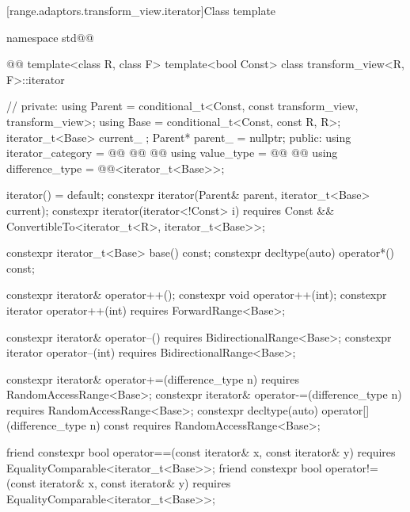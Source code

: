 [range.adaptors.transform_view.iterator]{Class template }

\pnum
{}

\begin{codeblock}
namespace std@@ { @@
  template<class R, class F>
  template<bool Const>
  class transform_view<R, F>::iterator { // \expos
  private:
    using Parent = conditional_t<Const, const transform_view, transform_view>;
    using Base   = conditional_t<Const, const R, R>;
    iterator_t<Base> current_ {};
    Parent* parent_ = nullptr;
  public:
    using iterator_category = @\newtxt{\seebelownc;}@
      @@
    @@
    using value_type        =
      @@
      @@
    using difference_type   = @@<iterator_t<Base>>;

    iterator() = default;
    constexpr iterator(Parent& parent, iterator_t<Base> current);
    constexpr iterator(iterator<!Const> i)
      requires Const && ConvertibleTo<iterator_t<R>, iterator_t<Base>>;

    constexpr iterator_t<Base> base() const;
    constexpr decltype(auto) operator*() const;

    constexpr iterator& operator++();
    constexpr void operator++(int);
    constexpr iterator operator++(int) requires ForwardRange<Base>;

    constexpr iterator& operator--() requires BidirectionalRange<Base>;
    constexpr iterator operator--(int) requires BidirectionalRange<Base>;

    constexpr iterator& operator+=(difference_type n)
      requires RandomAccessRange<Base>;
    constexpr iterator& operator-=(difference_type n)
      requires RandomAccessRange<Base>;
    constexpr decltype(auto) operator[](difference_type n) const
      requires RandomAccessRange<Base>;

    friend constexpr bool operator==(const iterator& x, const iterator& y)
      requires EqualityComparable<iterator_t<Base>>;
    friend constexpr bool operator!=(const iterator& x, const iterator& y)
      requires EqualityComparable<iterator_t<Base>>;

}}
\end{codeblock}
